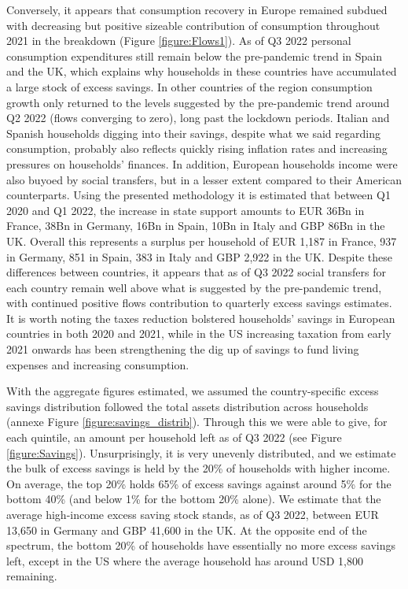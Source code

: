 Conversely, it appears that consumption recovery in Europe remained subdued with decreasing but positive sizeable contribution of consumption throughout 2021 in the breakdown (Figure \ref{figure:Flows1}).
As of Q3 2022 personal consumption expenditures still remain below the pre-pandemic trend in Spain and the UK, which explains why households in these countries have accumulated a large stock of excess savings. 
In other countries of the region consumption growth only returned to the levels suggested by the pre-pandemic trend around Q2 2022 (flows converging to zero), long past the lockdown periods. 
Italian and Spanish households digging into their savings, despite what we said regarding consumption, probably also reflects quickly rising inflation rates and increasing pressures on households’ finances. 
In addition, European households income were also buyoed by social transfers, but in a lesser extent compared to their American counterparts. 
Using the presented methodology it is estimated that between Q1 2020 and Q1 2022, the increase in state support amounts to EUR 36Bn in France, 38Bn in Germany, 16Bn in Spain, 10Bn in Italy and GBP 86Bn in the UK. 
Overall this represents a surplus per household of EUR 1,187 in France, 937 in Germany, 851 in Spain, 383 in Italy and GBP 2,922 in the UK.
Despite these differences between countries, it appears that as of Q3 2022 social transfers for each country remain well above what is suggested by the pre-pandemic trend, with continued positive flows contribution to quarterly excess savings estimates.
It is worth noting the taxes reduction bolstered households’ savings in European countries in both 2020 and 2021, while in the US increasing taxation from early 2021 onwards has been strengthening the dig up of savings to fund living expenses and increasing consumption.

With the aggregate figures estimated, we assumed the country-specific excess savings distribution followed the total assets distribution across households (annexe Figure \ref{figure:savings_distrib}). 
Through this we were able to give, for each quintile, an amount per household left as of Q3 2022 (see Figure \ref{figure:Savings}). 
Unsurprisingly, it is very unevenly distributed, and we estimate the bulk of excess savings is held by the 20\% of households with higher income. 
On average, the top 20\% holds 65\% of excess savings against around 5\% for the bottom 40\% (and below 1\% for the bottom 20\% alone). 
We estimate that the average high-income excess saving stock stands, as of Q3 2022, between EUR 13,650 in Germany and GBP 41,600 in the UK. 
At the opposite end of the spectrum, the bottom 20\% of households have essentially no more excess savings left, except in the US where the average household has around USD 1,800 remaining. 

